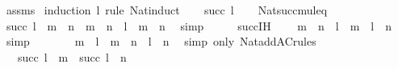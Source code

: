 \begin{isabellebody}
%
\isadelimproof
%
\endisadelimproof
%
\isatagproof
{}\isamarkupfalse%
\ assms\isanewline
{}\isamarkupfalse%
\ {\isacharparenleft}{\kern0pt}induction\ l\ rule{\isacharcolon}{\kern0pt}\ Nat{\isacharunderscore}{\kern0pt}induct{\isacharparenright}{\kern0pt}\isanewline
\ \ \isamarkupfalse%
\ {\isacharparenleft}{\kern0pt}succ\ l{\isacharparenright}{\kern0pt}\isanewline
\ \ \isamarkupfalse%
\ Nat{\isacharunderscore}{\kern0pt}succ{\isacharunderscore}{\kern0pt}mul{\isacharunderscore}{\kern0pt}eq\ \isamarkupfalse%
\ {\isachardoublequoteopen}succ\ l\ {\isacharasterisk}{\kern0pt}\ {\isacharparenleft}{\kern0pt}m\ {\isacharplus}{\kern0pt}\ n{\isacharparenright}{\kern0pt}\ {\isacharequal}{\kern0pt}\ m\ {\isacharplus}{\kern0pt}\ n\ {\isacharplus}{\kern0pt}\ l\ {\isacharasterisk}{\kern0pt}\ {\isacharparenleft}{\kern0pt}m\ {\isacharplus}{\kern0pt}\ n{\isacharparenright}{\kern0pt}{\isachardoublequoteclose}\ \isamarkupfalse%
\ simp\isanewline
\ \ \isamarkupfalse%
\ \isamarkupfalse%
\ succ{\isachardot}{\kern0pt}IH\ \isamarkupfalse%
\ {\isachardoublequoteopen}{\isachardot}{\kern0pt}{\isachardot}{\kern0pt}{\isachardot}{\kern0pt}\ {\isacharequal}{\kern0pt}\ m\ {\isacharplus}{\kern0pt}\ n\ {\isacharplus}{\kern0pt}\ {\isacharparenleft}{\kern0pt}l\ {\isacharasterisk}{\kern0pt}\ m\ {\isacharplus}{\kern0pt}\ l\ {\isacharasterisk}{\kern0pt}\ n{\isacharparenright}{\kern0pt}{\isachardoublequoteclose}\ \isamarkupfalse%
\ simp\isanewline
\ \ \isamarkupfalse%
\ \isamarkupfalse%
\ {\isachardoublequoteopen}{\isachardot}{\kern0pt}{\isachardot}{\kern0pt}{\isachardot}{\kern0pt}\ {\isacharequal}{\kern0pt}\ m\ {\isacharplus}{\kern0pt}\ l\ {\isacharasterisk}{\kern0pt}\ m\ {\isacharplus}{\kern0pt}\ {\isacharparenleft}{\kern0pt}n\ {\isacharplus}{\kern0pt}\ l\ {\isacharasterisk}{\kern0pt}\ n{\isacharparenright}{\kern0pt}{\isachardoublequoteclose}\ \isamarkupfalse%
\ {\isacharparenleft}{\kern0pt}simp\ only{\isacharcolon}{\kern0pt}\ Nat{\isacharunderscore}{\kern0pt}add{\isacharunderscore}{\kern0pt}AC{\isacharunderscore}{\kern0pt}rules{\isacharparenright}{\kern0pt}\isanewline
\ \ \isamarkupfalse%
\ \isamarkupfalse%
\ {\isachardoublequoteopen}{\isachardot}{\kern0pt}{\isachardot}{\kern0pt}{\isachardot}{\kern0pt}\ {\isacharequal}{\kern0pt}\ succ\ l\ {\isacharasterisk}{\kern0pt}\ m\ {\isacharplus}{\kern0pt}\ succ\ l\ {\isacharasterisk}{\kern0pt}\ n{\isachardoublequoteclose}\ \isamarkupfalse%

\end{isabellebody}
